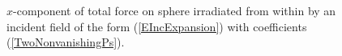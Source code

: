 \documentclass[letterpaper]{article}
\begin{document}
\begin{figure}[H]
\begin{center}
\caption{$x$-component of total force on sphere irradiated from 
         within by an incident field of the form (\ref{EIncExpansion}) 
         with coefficients (\ref{TwoNonvanishingPs}).
        }
\label{TotalForce}
\end{center}
\end{figure}
\end{document}
